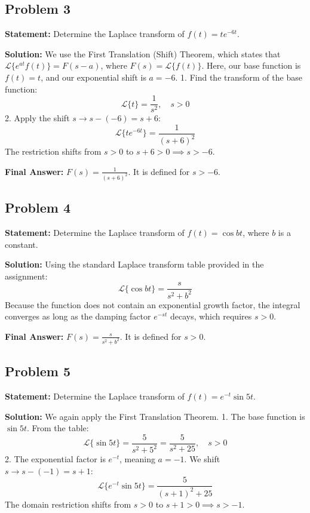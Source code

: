 \documentclass[11pt, a4paper]{article}
\theoremstyle{definition}
\theoremstyle{remark}
\begin{document}
\vspace{1em}
\subsection{Problem 3}
\textbf{Statement:} Determine the Laplace transform of $f(t) = t e^{-6t}$.

\textbf{Solution:}
We use the First Translation (Shift) Theorem, which states that $\mathscr{L}\{e^{at} f(t)\} = F(s - a)$, where $F(s) = \mathscr{L}\{f(t)\}$.
Here, our base function is $f(t) = t$, and our exponential shift is $a = -6$.
1. Find the transform of the base function:
\[
\mathscr{L}\{t\} = \frac{1}{s^2}, \quad s > 0
\]
2. Apply the shift $s \to s - (-6) = s + 6$:
\[
\mathscr{L}\{t e^{-6t}\} = \frac{1}{(s + 6)^2}
\]
The restriction shifts from $s > 0$ to $s + 6 > 0 \implies s > -6$.

\textbf{Final Answer:} $F(s) = \frac{1}{(s+6)^2}$. It is defined for $s > -6$.

\vspace{1em}
\subsection{Problem 4}
\textbf{Statement:} Determine the Laplace transform of $f(t) = \cos bt$, where $b$ is a constant.

\textbf{Solution:}
Using the standard Laplace transform table provided in the assignment:
\[
\mathscr{L}\{\cos bt\} = \frac{s}{s^2 + b^2}
\]
Because the function does not contain an exponential growth factor, the integral converges as long as the damping factor $e^{-st}$ decays, which requires $s > 0$.

\textbf{Final Answer:} $F(s) = \frac{s}{s^2 + b^2}$. It is defined for $s > 0$.

\vspace{1em}
\subsection{Problem 5}
\textbf{Statement:} Determine the Laplace transform of $f(t) = e^{-t} \sin 5t$.

\textbf{Solution:}
We again apply the First Translation Theorem. 
1. The base function is $\sin 5t$. From the table:
\[
\mathscr{L}\{\sin 5t\} = \frac{5}{s^2 + 5^2} = \frac{5}{s^2 + 25}, \quad s > 0
\]
2. The exponential factor is $e^{-t}$, meaning $a = -1$. We shift $s \to s - (-1) = s + 1$:
\[
\mathscr{L}\{e^{-t} \sin 5t\} = \frac{5}{(s + 1)^2 + 25}
\]
The domain restriction shifts from $s > 0$ to $s + 1 > 0 \implies s > -1$.
\end{document}
